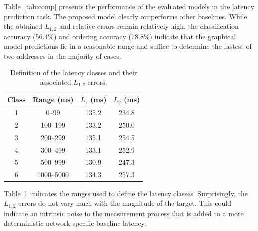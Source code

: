 \documentclass[10pt,a4paper,notitlepage,twocolumn]{article}
\begin{document}
Table~\ref{tab:comp} presents the performance of the evaluated models in the latency prediction task.
The proposed model clearly outperforms other baselines.
While the obtained $L_{1,2}$ and relative errors remain relatively high, the classification accuracy (56.4\%) and ordering accuracy (78.8\%) indicate that the graphical model predictions lie in a reasonable range and suffice to determine the fastest of two addresses in the majority of cases. 


\begin{table}[h]
\centering
\begin{tabular}{|cccc|}
\hline
Class & Range (ms) & $L_1$ (ms) & $L_2$ (ms) \\ \hline\hline
1 & 0--99 & 135.2 & 234.8 \\
2 & 100--199 & 133.2 & 250.0 \\
3 & 200--299 & 135.1 & 254.5 \\
4 & 300--499 & 133.1 & 252.9 \\
5 & 500--999 & 130.9 & 247.3 \\
6 & 1000--5000 & 134.3 & 257.3 \\
\hline 
\end{tabular} 
\caption{Definition of the latency classes and their associated $L_{1,2}$ errors.}
\label{tab:cl_l12}
\end{table}


Table~\ref{tab:cl_l12} indicates the ranges used to define the latency classes.
Surprisingly, the $L_{1,2}$ errors do not vary much with the magnitude of the target.
This could indicate an intrinsic noise to the measurement process that is added to a more deterministic network-specific baseline latency.
\end{document}
